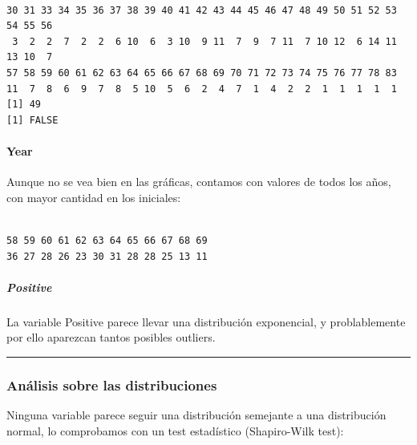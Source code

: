 \documentclass[
]{article}
\newenvironment{Shaded}{\begin{snugshade}}{\end{snugshade}}
\newcommand{\FloatTok}[1]{\textcolor[rgb]{0.00,0.00,0.81}{#1}}
\newcommand{\KeywordTok}[1]{\textcolor[rgb]{0.13,0.29,0.53}{\textbf{#1}}}
\newcommand{\NormalTok}[1]{#1}
\newcommand{\OperatorTok}[1]{\textcolor[rgb]{0.81,0.36,0.00}{\textbf{#1}}}
\newcommand{\StringTok}[1]{\textcolor[rgb]{0.31,0.60,0.02}{#1}}
\begin{document}
\begin{verbatim}

30 31 33 34 35 36 37 38 39 40 41 42 43 44 45 46 47 48 49 50 51 52 53 54 55 56 
 3  2  2  7  2  2  6 10  6  3 10  9 11  7  9  7 11  7 10 12  6 14 11 13 10  7 
57 58 59 60 61 62 63 64 65 66 67 68 69 70 71 72 73 74 75 76 77 78 83 
11  7  8  6  9  7  8  5 10  5  6  2  4  7  1  4  2  2  1  1  1  1  1 
[1] 49
[1] FALSE
\end{verbatim}

\hypertarget{year}{%
\paragraph{Year}\label{year}}

Aunque no se vea bien en las gráficas, contamos con valores de todos los
años, con mayor cantidad en los iniciales:

\begin{Shaded}
\end{Shaded}

\begin{verbatim}

58 59 60 61 62 63 64 65 66 67 68 69 
36 27 28 26 23 30 31 28 28 25 13 11 
\end{verbatim}

\hypertarget{positive}{%
\subparagraph{Positive}\label{positive}}

La variable Positive parece llevar una distribución exponencial, y
problablemente por ello aparezcan tantos posibles outliers.

\begin{center}\rule{0.5\linewidth}{0.5pt}\end{center}

\hypertarget{anuxe1lisis-sobre-las-distribuciones}{%
\subsubsection{Análisis sobre las
distribuciones}\label{anuxe1lisis-sobre-las-distribuciones}}

Ninguna variable parece seguir una distribución semejante a una
distribución normal, lo comprobamos con un test estadístico
(Shapiro-Wilk test):

\begin{Shaded}
\end{Shaded}
\end{document}
